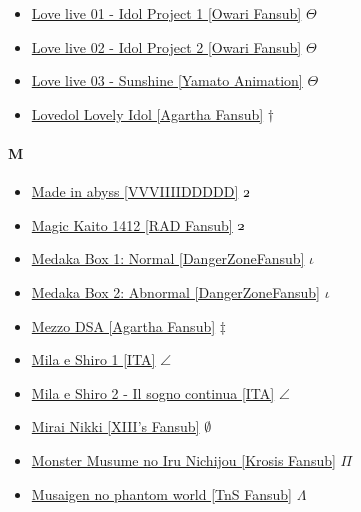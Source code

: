 \begin{itemize}
				\item \href{https://mega.nz/#F!5C4jQS5b!tQP2_gyd6sVo_lob3HrJpA} {Love live 01 - Idol Project 1 [Owari Fansub]}  $\varTheta$ \\
				\item \href{https://mega.nz/#F!4fZwQZyb!7KicEgJ3hjDpHWAOgsODRQ} {Love live 02 - Idol Project 2 [Owari Fansub]}  $\varTheta$ \\ 
				\item \href{https://mega.nz/#F!JXZTCb6Q!Y-7MdF52Ap5FYVBZ3R-W6w} {Love live 03 - Sunshine [Yamato Animation]}  $\varTheta$ \\ 	
				\item \href{https://mega.nz/#F!aHBxHYhB!2iDg7QLN5ldf2SXcSKk3oQ} {Lovedol Lovely Idol [Agartha Fansub]}  $\dag$ \\ 		
		\end{itemize}	
		
		\paragraph{M} \hypertarget{SM}{}
			\begin{itemize}
				
				\item \href{https://mega.nz/#F!naoxBQAb!Ob10ktPNa2F1N1NRxo60ag} {Made in abyss [VVVIIIIDDDDD]}  $\oldstylenums{2}$ \\ 
				\item \href{https://mega.nz/#F!LLogGDpC!Fu8pN0-VrYP4oA4A9WImwA} {Magic Kaito 1412 [RAD Fansub]}  $\oldstylenums{2}$ \\ 
				\item \href{https://mega.nz/#F!c5JUiBLa!6ITewSGg9n_0ExRanwjrUw} {Medaka Box 1: Normal [DangerZoneFansub]}  $\iota$ \\ 
				\item \href{https://mega.nz/#F!tx5yzRhJ!LOQ31TTrjJ522Gr0ITbccQ} {Medaka Box 2: Abnormal [DangerZoneFansub]}  $\iota$ \\ 
				\item \href{https://mega.nz/#F!SuQzxCLC!ydTQ3_Q2GKYKsTUaKnBBMw} {Mezzo DSA [Agartha Fansub]}  $\ddag$ \\ 
				\item \href{https://mega.nz/#F!YvgAFBZJ!7QQ7zkiQIentnrGQF9ESAA} {Mila e Shiro 1 [ITA]}  $\angle$ \\ 
				\item \href{https://mega.nz/#F!huxSQJSa!Z4P4HjL34Tm0stuP29hF7A} {Mila e Shiro 2 - Il sogno continua [ITA]}  $\angle$ \\ 
				\item \href{https://mega.nz/#F!YPRmEarD!smGi4zn8nBzUCGN6Hrpq8g} {Mirai Nikki [XIII's Fansub]}  $\emptyset$ \\ 
				\item \href{https://mega.nz/#F!RLwEBTZT!4GupNdxlXxIi2ZeOF4hS2Q} {Monster Musume no Iru Nichijou [Krosis Fansub]}  $\Pi$ \\ 
				\item \href{https://mega.nz/#F!ZTxCFKoC!Tr2JyRg2JcgfhTsbmHA_nw} {Musaigen no phantom world [TnS Fansub]}  $\varLambda$ \\ 
			
			\end{itemize}
			
